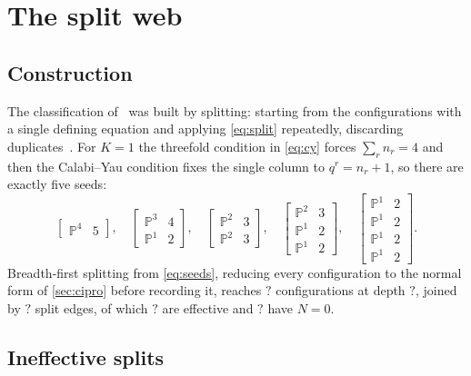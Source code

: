\documentclass[11pt,a4paper]{article}
\newcommand{\FactDepth}{?}\newcommand{\FactConfigs}{?}
\newcommand{\FactEdges}{?}\newcommand{\FactEffective}{?}
\newcommand{\FactIneffective}{?}\newcommand{\FactHodgePairs}{?}
\newcommand{\PP}{\mathbb{P}}
\theoremstyle{definition}
\begin{document}
\section{The split web}
\label{sec:web}

\subsection{Construction}

The classification of~\cite{Candelas1988} was built by splitting: starting
from the configurations with a single defining equation and applying
\cref{eq:split} repeatedly, discarding duplicates~\cite{Candelas1988,Green1987, Green1989}. For $K=1$ the threefold
condition in \cref{eq:cy} forces $\sum_r n_r = 4$ and then the Calabi--Yau
condition fixes the single column to $q^r = n_r+1$, so there are exactly five
seeds:
%
\begin{equation}
\begin{bmatrix}\PP^4 & 5\end{bmatrix},\quad
\begin{bmatrix}\PP^3 & 4\\ \PP^1 & 2\end{bmatrix},\quad
\begin{bmatrix}\PP^2 & 3\\ \PP^2 & 3\end{bmatrix},\quad
\begin{bmatrix}\PP^2 & 3\\ \PP^1 & 2\\ \PP^1 & 2\end{bmatrix},\quad
\begin{bmatrix}\PP^1 & 2\\ \PP^1 & 2\\ \PP^1 & 2\\ \PP^1 & 2\end{bmatrix}.
\label{eq:seeds}
\end{equation}
%
Breadth-first splitting from \cref{eq:seeds}, reducing every configuration to
the normal form of \cref{sec:cipro} before recording it, reaches $\FactConfigs$
configurations at depth $\FactDepth$, joined by $\FactEdges$ split edges, of
which $\FactEffective$ are effective and $\FactIneffective$ have $N=0$.

\subsection{Ineffective splits}
\end{document}
